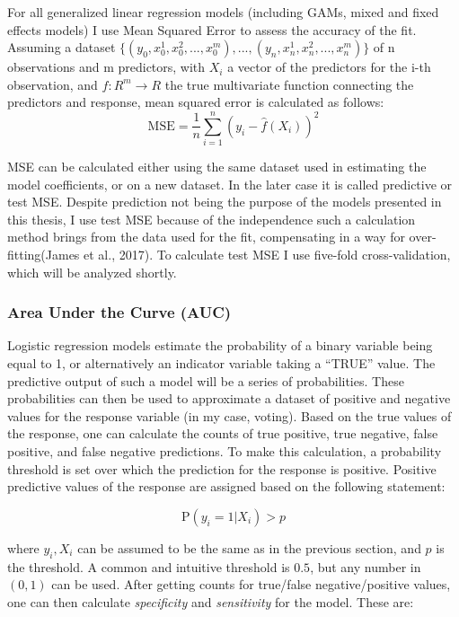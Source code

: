 \documentclass[12pt,twoside]{reedthesis}
\begin{document}
  For all generalized linear regression models (including GAMs, mixed and
  fixed effects models) I use Mean Squared Error to assess the accuracy of
  the fit. Assuming a dataset
  \(\{(y_0, x_0^1, x_0^2, ..., x_0^m),...,(y_n, x_n^1, x_n^2, ..., x_n^m)\}\)
  of n observations and m predictors, with \(X_i\) a vector of the
  predictors for the i-th observation, and \(f:R^m \to R\) the true
  multivariate function connecting the predictors and response, mean
  squared error is calculated as follows:
  \[\text{MSE} = \frac{1}{n}\sum_{i=1}^{n}(y_i - \hat{f}(X_i))^2\]
  
  MSE can be calculated either using the same dataset used in estimating
  the model coefficients, or on a new dataset. In the later case it is
  called predictive or test MSE. Despite prediction not being the purpose
  of the models presented in this thesis, I use test MSE because of the
  independence such a calculation method brings from the data used for the
  fit, compensating in a way for over-fitting(James et al., 2017). To
  calculate test MSE I use five-fold cross-validation, which will be
  analyzed shortly.
  
  \subsubsection{Area Under the Curve
  (AUC)}\label{area-under-the-curve-auc}
  
  Logistic regression models estimate the probability of a binary variable
  being equal to 1, or alternatively an indicator variable taking a
  ``TRUE'' value. The predictive output of such a model will be a series
  of probabilities. These probabilities can then be used to approximate a
  dataset of positive and negative values for the response variable (in my
  case, voting). Based on the true values of the response, one can
  calculate the counts of true positive, true negative, false positive,
  and false negative predictions. To make this calculation, a probability
  threshold is set over which the prediction for the response is positive.
  Positive predictive values of the response are assigned based on the
  following statement:
  
  \[\text{P}(y_i = 1|X_i) > p\]
  
  where \(y_i, X_i\) can be assumed to be the same as in the previous
  section, and \(p\) is the threshold. A common and intuitive threshold is
  \(0.5\), but any number in \((0,1)\) can be used. After getting counts
  for true/false negative/positive values, one can then calculate
  \emph{specificity} and \emph{sensitivity} for the model. These are:
  
\end{document}

